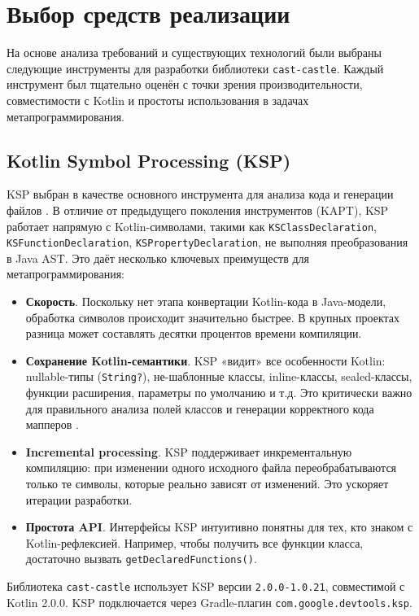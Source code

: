 \section{Выбор средств реализации}

На основе анализа требований и существующих технологий были выбраны следующие инструменты для разработки библиотеки \texttt{cast-castle}. Каждый инструмент был тщательно оценён с точки зрения производительности, совместимости с Kotlin и простоты использования в задачах метапрограммирования.

\subsection{Kotlin Symbol Processing (KSP)}

KSP выбран в качестве основного инструмента для анализа кода и генерации файлов \cite{refg, refj}. В отличие от предыдущего поколения инструментов (KAPT), KSP работает напрямую с Kotlin-символами, такими как \texttt{KSClassDeclaration}, \texttt{KSFunctionDeclaration}, \texttt{KSPropertyDeclaration}, не выполняя преобразования в Java AST. Это даёт несколько ключевых преимуществ для метапрограммирования:

\begin{itemize}
    \item \textbf{Скорость}. Поскольку нет этапа конвертации Kotlin-кода в Java-модели, обработка символов происходит значительно быстрее. В крупных проектах разница может составлять десятки процентов времени компиляции.
    \item \textbf{Сохранение Kotlin-семантики}. KSP «видит» все особенности Kotlin: nullable-типы (\texttt{String?}), не-шаблонные классы, inline-классы, sealed-классы, функции расширения, параметры по умолчанию и т.д. Это критически важно для правильного анализа полей классов и генерации корректного кода мапперов \cite{refa}.
    \item \textbf{Incremental processing}. KSP поддерживает инкрементальную компиляцию: при изменении одного исходного файла переобрабатываются только те символы, которые реально зависят от изменений. Это ускоряет итерации разработки.
    \item \textbf{Простота API}. Интерфейсы KSP интуитивно понятны для тех, кто знаком с Kotlin-рефлексией. Например, чтобы получить все функции класса, достаточно вызвать \texttt{getDeclaredFunctions()}.
\end{itemize}

Библиотека \texttt{cast-castle} использует KSP версии \texttt{2.0.0-1.0.21}, совместимой с Kotlin 2.0.0. KSP подключается через Gradle-плагин \texttt{com.google.devtools.ksp}.

